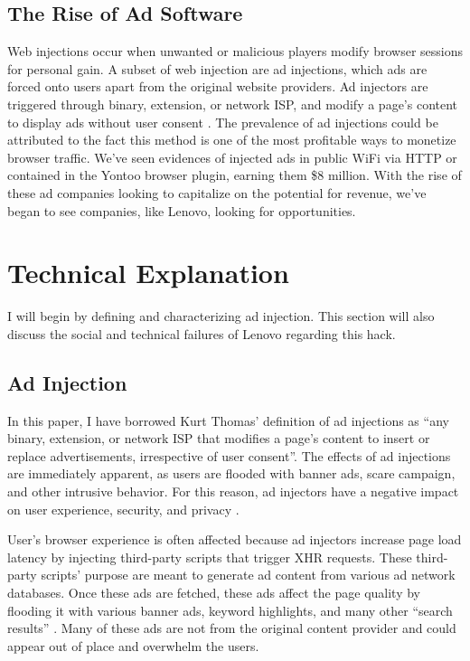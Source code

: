 \documentclass[journal]{IEEEtran}
\begin{document}
\subsection{The Rise of Ad Software}
Web injections occur when unwanted or malicious players modify browser sessions for personal gain. A subset of web injection are ad injections, which ads are forced onto users apart from the original website providers. Ad injectors are triggered through binary, extension, or network ISP, and modify a page's content to display ads without user consent \cite{ad_inject}. The prevalence of ad injections could be attributed to the fact this method is one of the most profitable ways to monetize browser traffic. We've seen evidences of injected ads in public WiFi via HTTP\cite{att_inject} or contained in the Yontoo browser plugin, earning them \$8 million\cite{ad_inject}. With the rise of these ad companies looking to capitalize on the potential for revenue, we've began to see companies, like Lenovo, looking for opportunities.

\section{Technical Explanation}
I will begin by defining and characterizing ad injection. This section will also discuss the social and technical failures of Lenovo regarding this hack.

\subsection{Ad Injection}
In this paper, I have borrowed Kurt Thomas' definition of ad injections as ``any binary, extension, or network ISP that modifies a page's content to insert or replace advertisements, irrespective of user consent''. The effects of ad injections are immediately apparent, as users are flooded with banner ads, scare campaign, and other intrusive behavior. For this reason, ad injectors have a negative impact on user experience, security, and privacy \cite{ad_inject}. 

User's browser experience is often affected because ad injectors increase page load latency by injecting third-party scripts that trigger XHR requests. These third-party scripts' purpose are meant to generate ad content from various ad network databases. Once these ads are fetched, these ads affect the page quality by flooding it with various banner ads, keyword highlights, and many other ``search results'' \cite{ad_inject}. Many of these ads are not from the original content provider and could appear out of place and overwhelm the users.
\end{document}
